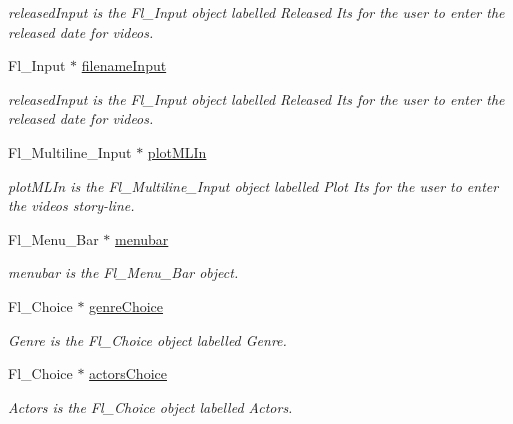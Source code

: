 \begin{DoxyCompactItemize}
\begin{DoxyCompactList}\small\item\em released\+Input is the Fl\+\_\+\+Input object labelled Released Its for the user to enter the released date for videos. \end{DoxyCompactList}\item 
\hypertarget{class_movie_client_gui_a57815f6e0a5d6b57e88f252fe3c88d6c}{}Fl\+\_\+\+Input $\ast$ \hyperlink{class_movie_client_gui_a57815f6e0a5d6b57e88f252fe3c88d6c}{filename\+Input}\label{class_movie_client_gui_a57815f6e0a5d6b57e88f252fe3c88d6c}

\begin{DoxyCompactList}\small\item\em released\+Input is the Fl\+\_\+\+Input object labelled Released Its for the user to enter the released date for videos. \end{DoxyCompactList}\item 
\hypertarget{class_movie_client_gui_a13b2a12e2dc8a12f97f39d07cea98de4}{}Fl\+\_\+\+Multiline\+\_\+\+Input $\ast$ \hyperlink{class_movie_client_gui_a13b2a12e2dc8a12f97f39d07cea98de4}{plot\+M\+L\+In}\label{class_movie_client_gui_a13b2a12e2dc8a12f97f39d07cea98de4}

\begin{DoxyCompactList}\small\item\em plot\+M\+L\+In is the Fl\+\_\+\+Multiline\+\_\+\+Input object labelled Plot Its for the user to enter the video\textquotesingle{}s story-\/line. \end{DoxyCompactList}\item 
Fl\+\_\+\+Menu\+\_\+\+Bar $\ast$ \hyperlink{class_movie_client_gui_a6b91d5aaf8cb97e4d8c6fee6013fa203}{menubar}
\begin{DoxyCompactList}\small\item\em menubar is the Fl\+\_\+\+Menu\+\_\+\+Bar object. \end{DoxyCompactList}\item 
Fl\+\_\+\+Choice $\ast$ \hyperlink{class_movie_client_gui_adbe9044856cfbf73c9b2e5afd5292020}{genre\+Choice}
\begin{DoxyCompactList}\small\item\em Genre is the Fl\+\_\+\+Choice object labelled Genre. \end{DoxyCompactList}\item 
Fl\+\_\+\+Choice $\ast$ \hyperlink{class_movie_client_gui_ad6d29ccb3c824b894638f2667cb1200d}{actors\+Choice}
\begin{DoxyCompactList}\small\item\em Actors is the Fl\+\_\+\+Choice object labelled Actors. \end{DoxyCompactList}\end{DoxyCompactItemize}


